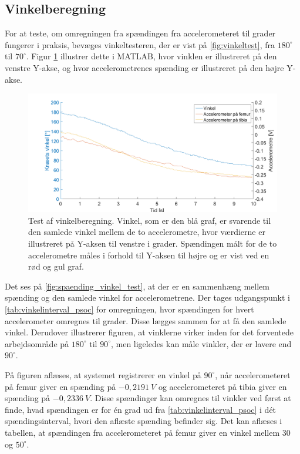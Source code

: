 \subsection{Vinkelberegning}

For at teste, om omregningen fra spændingen fra accelerometeret til grader fungerer i praksis, bevæges vinkeltesteren, der er vist på \autoref{fig:vinkeltest}, fra $180^{\circ}$ til $70^{\circ}$. Figur \ref{fig:spaending_vinkel_test} illustrer dette i MATLAB, hvor vinklen er illustreret på den venstre Y-akse, og hvor accelerometrenes spænding er illustreret på den højre Y-akse.

\begin{figure}[H]
\centering
\includegraphics[width=1\textwidth]{figures/spaending_vinkel_test}
\caption{Test af vinkelberegning. Vinkel, som er den blå graf, er svarende til den samlede vinkel mellem de to accelerometre, hvor værdierne er illustreret på Y-aksen til venstre i grader. Spændingen målt for de to accelerometre måles i forhold til Y-aksen til højre og er vist ved en rød og gul graf.}
\label{fig:spaending_vinkel_test}
\end{figure}

\noindent
Det ses på \autoref{fig:spaending_vinkel_test}, at der er en sammenhæng mellem spænding og den samlede vinkel for accelerometrene. Der tages udgangspunkt i \autoref{tab:vinkelinterval_psoc} for omregningen, hvor spændingen for hvert accelerometer omregnes til grader. Disse lægges sammen for at få den samlede vinkel. Derudover illustrerer figuren, at vinklerne virker inden for det forventede arbejdsområde på $180^{\circ}$ til $90^{\circ}$, men ligeledes kan måle vinkler, der er lavere end $90^{\circ}$.

På figuren aflæses, at systemet registrerer en vinkel på $90^{\circ}$, når  accelerometeret på femur giver en spænding på $-0,2191~V$ og accelerometeret på tibia giver en spænding på $-0,2336~V$. Disse spændinger kan omregnes til vinkler ved først at finde, hvad spændingen er for én grad ud fra \autoref{tab:vinkelinterval_psoc}  i dét spændingsinterval, hvori den aflæste spænding befinder sig. Det kan aflæses i tabellen, at spændingen fra accelerometeret på femur giver en vinkel mellem 30 og $50^{\circ}$.

